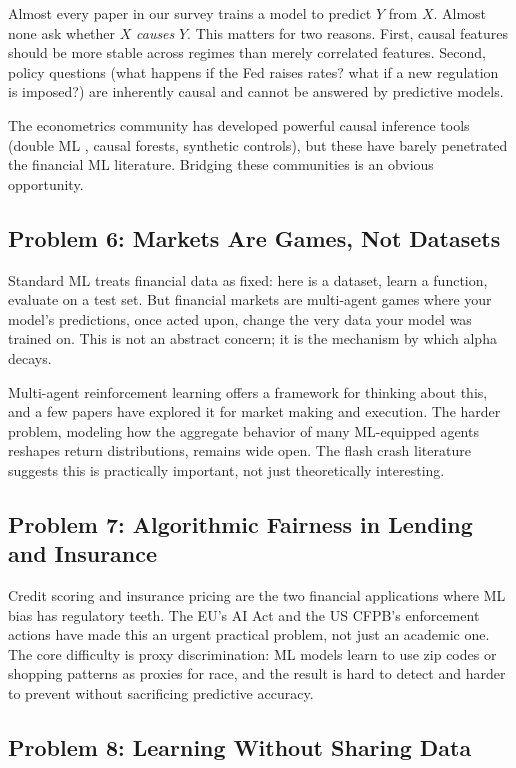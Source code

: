 Almost every paper in our survey trains a model to predict $Y$ from $X$. Almost none ask whether $X$ \textit{causes} $Y$. This matters for two reasons. First, causal features should be more stable across regimes than merely correlated features. Second, policy questions (what happens if the Fed raises rates? what if a new regulation is imposed?) are inherently causal and cannot be answered by predictive models.

The econometrics community has developed powerful causal inference tools (double ML \citep{Chernozhukov2018}, causal forests, synthetic controls), but these have barely penetrated the financial ML literature. Bridging these communities is an obvious opportunity.

\subsection{Problem 6: Markets Are Games, Not Datasets}

Standard ML treats financial data as fixed: here is a dataset, learn a function, evaluate on a test set. But financial markets are multi-agent games where your model's predictions, once acted upon, change the very data your model was trained on. This is not an abstract concern; it is the mechanism by which alpha decays.

Multi-agent reinforcement learning offers a framework for thinking about this, and a few papers have explored it for market making and execution. The harder problem, modeling how the aggregate behavior of many ML-equipped agents reshapes return distributions, remains wide open. The flash crash literature suggests this is practically important, not just theoretically interesting.

\subsection{Problem 7: Algorithmic Fairness in Lending and Insurance}

Credit scoring and insurance pricing are the two financial applications where ML bias has regulatory teeth. The EU's AI Act and the US CFPB's enforcement actions have made this an urgent practical problem, not just an academic one. The core difficulty is proxy discrimination: ML models learn to use zip codes or shopping patterns as proxies for race, and the result is hard to detect and harder to prevent without sacrificing predictive accuracy.

\subsection{Problem 8: Learning Without Sharing Data}

